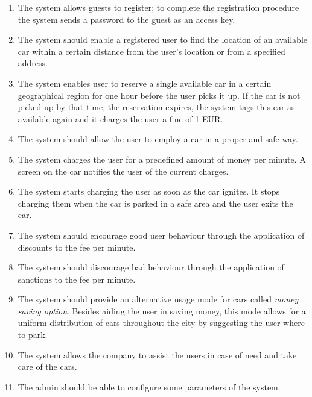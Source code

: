 
			
			\begin{enumerate}
				\item The system allows guests to register; to complete the registration procedure the system sends a password to the guest as an access key.
				\item The system should enable a registered user to find the location of an available car within a certain distance from the user's location or from a specified address.
				\item The system enables user to reserve a single available car in a certain geographical region for one hour before the user picks it up. If the car is not picked up by that time, the reservation expires, the system tags this car as available again and it charges the user a fine of 1 EUR.
				
				\item The system should allow the user to employ a car in a proper and safe way. 				
								
				\item The system charges the user for a predefined amount of money per minute. A screen on the car notifies the user of the current charges.
				\item The system starts charging the user as soon as the car ignites. It stops charging them when the car is parked in a safe area and the user exits the car.
				\item The system should encourage good user behaviour through the application of discounts to the fee per minute. 
				\item The system should discourage bad behaviour through the application of sanctions to the fee per minute. 
				\item The system should provide an alternative usage mode for cars called \textit{money saving option}. Besides aiding the user in saving money, this mode allows for a uniform distribution of cars throughout the city by suggesting the user where to park.
				\item The system allows the company to assist the users in case of need and take care of the cars.				
				\item The admin should be able to configure some parameters of the system.
			\end{enumerate}	
